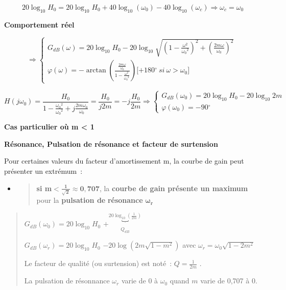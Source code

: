 \[20\log_{10}H_{0} = 20\log_{10}H_{0} + 40\log_{10}\left( \omega_{0} \right) - 40\log_{10}\left( \omega_{c} \right) \Longrightarrow \omega_{c} = \omega_{0}\]

\textbf{Comportement réel}

\[\mathbf{\Longrightarrow}\left\{ \begin{array}{r}
G_{dB}(\omega) = 20\log_{10}H_{0} - 20\log_{10}\sqrt{\left( 1 - \frac{\omega^{2}}{{\omega_{0}}^{2}} \right)^{2} + \left( \frac{2m\omega}{\omega_{0}} \right)^{2}} \\
\varphi(\omega) = - \arctan\left( \frac{\frac{2m\omega}{\omega_{0}}}{1 - \frac{\omega^{2}}{{\omega_{0}}^{2}}} \right)\lbrack + 180{^\circ}\ si\ \omega > \omega_{0}\rbrack
\end{array} \right.\ \]

\[H\left( j\omega_{0} \right) = \frac{H_{0}}{1 - \frac{{\omega_{0}}^{2}}{{\omega_{0}}^{2}} + j\frac{2m\omega_{0}}{\omega_{0}}} = \frac{H_{0}}{j2m} = - j\frac{H_{0}}{2m} \Longrightarrow \left\{ \begin{array}{r}
G_{dB}\left( \omega_{0} \right) = 20\log_{10}H_{0} - {20\log_{10}{2m}}^{}\  \\
\varphi\left( \omega_{0} \right) = - 90{^\circ}
\end{array} \right.\ \]

\textbf{Cas particulier où m \textless{} 1}

\textbf{Résonance, Pulsation de résonance et facteur de surtension}

Pour certaines valeurs du facteur d'amortissement m, la courbe de gain peut présenter un extrémum~:

\begin{itemize}
\item
  \begin{quote}
  \textbf{si m}\(< \frac{\mathbf{1}}{\sqrt{\mathbf{2}}}\mathbf{\approx 0,707}\), la \textbf{courbe de gain présente un maximum} pour la \textbf{pulsation de} \textbf{résonance} \(\mathbf{\omega}_{\mathbf{r}}\)
  \end{quote}
\end{itemize}

\begin{quote}
\(G_{dB}\left( \omega_{0} \right) = 20\log_{10}H_{0}\) \(+ \underset{Q_{dB}}{\overset{20\log_{10}\left( \frac{1}{2m} \right)}{︸}}\)

\(G_{dB}\left( \omega_{r} \right) = 20\log_{10}H_{0}\) \(- 20\log\left( 2m\sqrt{1 - m^{2}} \right)\) avec \(\omega_{r} = \omega_{0}\sqrt{1 - 2m^{2}}\)

Le facteur de qualité (ou surtension) est noté~: \(Q = \frac{1}{2m}\) .

La pulsation de résonnance \(\omega_{r}\) varie de 0 à \(\omega_{0}\) quand \(m\) varie de 0,707 à 0.
\end{quote}

